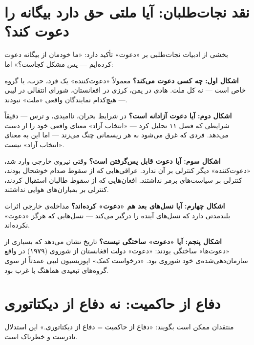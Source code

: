 \section{نقد نجات‌طلبان: آیا ملتی حق دارد بیگانه را دعوت کند؟}
\label{sec:app-b-invitee-critique}

بخشی از ادبیات نجات‌طلبی بر «دعوت» تأکید دارد: «ما خودمان از بیگانه دعوت کرده‌ایم — پس مشکل کجاست؟» اما:

\begin{tcolorbox}[wavebox, title={پنج اشکال در استدلال «دعوت»}]
\textbf{اشکال اول: چه کسی دعوت می‌کند؟}
معمولاً «دعوت‌کننده» یک فرد، حزب، یا گروه خاص است — نه کل ملت. هادی در یمن، کرزی در افغانستان، شورای انتقالی در لیبی — هیچ‌کدام نمایندگان واقعی «ملت» نبودند.

\textbf{اشکال دوم: آیا دعوت آزادانه است؟}
در شرایط بحران، ناامیدی، و ترس — دقیقاً شرایطی که فصل ۱۱ تحلیل کرد — «انتخاب آزاد» معنای واقعی خود را از دست می‌دهد. فردی که غرق می‌شود به هر ریسمانی چنگ می‌زند — اما این به معنای «انتخاب آزاد» نیست.

\textbf{اشکال سوم: آیا دعوت قابل پس‌گرفتن است؟}
وقتی نیروی خارجی وارد شد، «دعوت‌کننده» دیگر کنترلی بر آن ندارد. عراقی‌هایی که از سقوط صدام خوشحال بودند، کنترلی بر سیاست‌های برمر نداشتند. افغان‌هایی که از سقوط طالبان استقبال کردند، کنترلی بر بمباران‌های هوایی نداشتند.

\textbf{اشکال چهارم: آیا نسل‌های بعد هم «دعوت» کرده‌اند؟}
مداخله‌ی خارجی اثرات بلندمدتی دارد که نسل‌های آینده را درگیر می‌کند — نسل‌هایی که هرگز «دعوت» نکرده‌اند.

\textbf{اشکال پنجم: آیا «دعوت» ساختگی نیست؟}
تاریخ نشان می‌دهد که بسیاری از «دعوت‌ها» ساختگی بودند: «دعوت» دولت افغانستان از شوروی (۱۹۷۹) در واقع سازمان‌دهی‌شده‌ی خود شوروی بود. «درخواست کمک» اپوزیسیون لیبی عمدتاً از سوی گروه‌های تبعیدی هماهنگ با غرب بود.
\end{tcolorbox}


\section{دفاع از حاکمیت: نه دفاع از دیکتاتوری}
\label{sec:app-b-sovereignty}

منتقدان ممکن است بگویند: «دفاع از حاکمیت = دفاع از دیکتاتوری.» این استدلال نادرست و خطرناک است.

